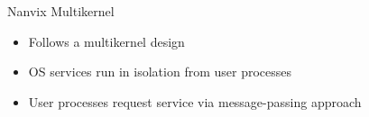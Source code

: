 		\begin{frame}[fragile]{Nanvix Multikernel}

			\begin{itemize}
				\item Follows a multikernel design
				\item OS services run in isolation from user processes
				\item User processes request service via message-passing approach
			\end{itemize}



		\end{frame}


